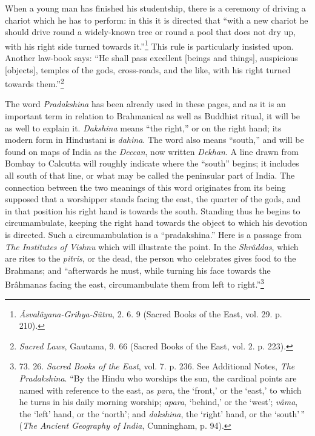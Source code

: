 \documentclass[a4paper, 11pt, oneside, polutonikogreek, english]{article}
\begin{document}
When a young man has finished his studentship, there is a ceremony of driving a chariot which he has to perform: in this it is directed that ``with a new chariot he should drive round a widely-known tree or round a pool that does not dry up, with his right side turned towards it.''\footnote{\emph{Âsvalâyana-Grihya-Sûtra}, 2. 6. 9 (Sacred Books of the East, vol. 29. p. 210).} This rule is particularly insisted upon. Another law-book says: ``He shall pass excellent [beings and things], auspicious [objects], temples of the gods, cross-roads, and the like, with his right turned towards them.''\footnote{\emph{Sacred Laws}, Gautama, 9. 66  (Sacred Books of the East, vol. 2. p. 223).}

The word \emph{Pradakshina} has been already used in these pages, and as it is an important term in relation to Brahmanical as well as Buddhist ritual, it will be as well to explain it. \emph{Dakshina} means ``the right,'' or on the right hand; its modern form in Hindustani is \emph{dahina}. The word also means ``south,'' and will be found on maps of India as the \emph{Deccan}, now written \emph{Dekhan}. A line drawn from Bombay to Calcutta will roughly indicate where the ``south'' begins; it includes all south of that line, or what may be called the peninsular part of India. The connection between the two meanings of this word originates from its being supposed that a worshipper stands facing the east, the quarter of the gods, and in that position his right hand is towards the south. Standing thus he begins to circumambulate, keeping the right hand towards the object to which his devotion is directed. Such a circumambulation is a ``pradakshina.'' Here is a passage from \emph{The Institutes of Vishnu} which will illustrate the point. In the \emph{Shrâddas}, which are rites to the \emph{pitris}, or the dead, the person who celebrates gives food to the Brahmans; and ``afterwards he must, while turning his face towards the Brâhmanas facing the east, circumambulate them from left to right.''\footnote{73. 26. \emph{Sacred Books of the East}, vol. 7. p. 236. See Additional Notes, \emph{The Pradakshina}. ``By the Hindu who worships the sun, the cardinal points are named with reference to the east, as \emph{para}, the `front,' or the `east,' to which he turns in his daily morning worship; \emph{apara}, `behind,' or the `west'; \emph{vâma}, the `left' hand, or the `north'; and \emph{dakshina}, the `right' hand, or the `south'\,'' (\emph{The Ancient Geography of India}, Cunningham, p. 94).}
\end{document}
